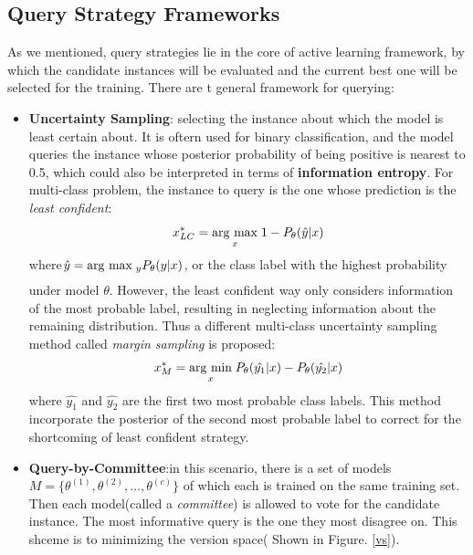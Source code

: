 \subsection{Query Strategy Frameworks}
As we mentioned, query strategies lie in the core of active learning framework, by which the candidate instances will be evaluated and the current best one will be selected for the training.  There are t general framework for querying\cite{Settles2010}:
\begin{itemize}
  \item \textbf{Uncertainty Sampling}: selecting the instance about which the model is least certain about. It is oftern used  for binary classification, and the model queries the instance whose posterior probability of being positive is nearest to 0.5, which could also be interpreted in terms of \textbf{information entropy}\cite{dasgupta2008hierarchical}. For multi-class problem, the instance to query is the one whose prediction is the \textit{least confident}\colorbox{green}{\cite{Prince2004}}:
  \begin{equation}
  x_{LC}^{*}=\underset{x}{\operatorname{arg}\,\operatorname{max}}\; 1-P_{\theta}(\hat{y}|x)  
  \end{equation}
  where$\hat{y}=\underset{}{\operatorname{arg}\,\operatorname{max}}\;_{y}P_{\theta}(y|x)$, or the class label with the highest probability under model $\theta$. However, the least confident way only considers information of the most probable label, resulting in neglecting information about the remaining distribution. Thus a different multi-class uncertainty sampling method called \textit{margin sampling} is proposed:
  \begin{equation}
  x_{M}^{*}=\underset{x}{\operatorname{arg}\,\operatorname{min}}\;P_{\theta}(\hat{y_1}|x)-P_{\theta}(\hat{y_2}|x)
  \end{equation}
  where $\hat{y_1} $ and $\hat{y_2}$ are the first two most probable class labels. This method incorporate the posterior of the second most probable label to correct for the shortcoming of least confident strategy.
  \item \textbf{Query-by-Committee}:in this scenario, there is a set of models $M=\{\theta^{(1)},\theta^{(2)},\ldots,\theta^{(c)}\}$ of which each is trained on the same training set. Then each model(called a \textit{committee}) is allowed to vote for the candidate instance. The most informative query is the one they most disagree on. This shceme is to minimizing the version space( Shown in Figure. \ref{vs}\colorbox{green}{\cite{Settles2010}}). 
  \begin{figure}[htbp]
   \centering

\end{figure}
\end{itemize}
